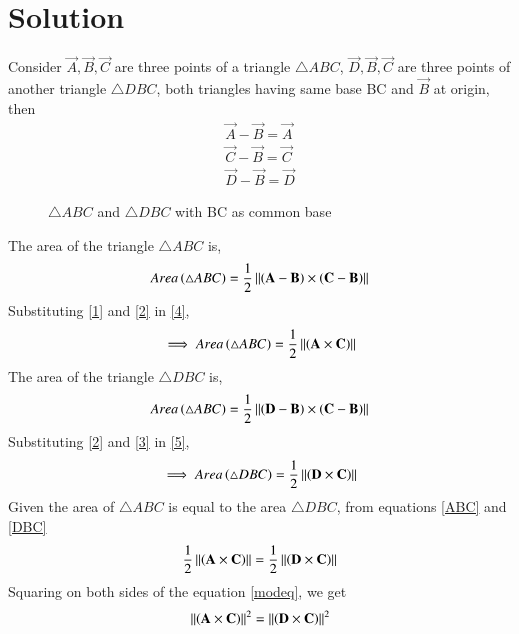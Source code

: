 \documentclass[journal,12pt,twocolumn]{IEEEtran}
\begin{document}
\section{Solution}
\item Consider $\vec{A},\vec{B},\vec{C}$ are three points of a triangle $\triangle ABC$, $\vec{D}, \vec{B}, \vec{C}$ are three points of another triangle $\triangle DBC$, both triangles having same base BC and $\vec{B}$ at origin, then
\begin{align}
    \label{1}
    \vec{A}-\vec{B}=\vec{A}\\
    \label{2}
    \vec{C}-\vec{B}=\vec{C}\\
    \label{3}
    \vec{D}-\vec{B}=\vec{D}
\end{align}
\renewcommand{\thefigure}{1}
\begin{figure}[!ht]
\centering
\resizebox{\columnwidth}{!}{}
\caption{$\triangle ABC$ and $\triangle DBC$ with BC as common base}
\label{fig:1.2}
\end{figure}
The area of the triangle $\triangle ABC$ is,
\begin{align}
    \label{4}
    Area\left(\triangle ABC\right) = \frac{1}{2}\left\lVert\left(\mathbf{A} - \mathbf{B}\right) \times \left(\mathbf{C} - \mathbf{B}\right)\right\rVert
\end{align}
Substituting \eqref{1} and \eqref{2} in \eqref{4}, 
\begin{align}
    \label{ABC}
    \implies Area\left(\triangle ABC\right) = \frac{1}{2}\left\lVert\left(\mathbf{A} \times \mathbf{C}\right)\right\rVert
\end{align}
The area of the triangle $\triangle DBC$ is,
\begin{align}
    \label{5}
    Area\left(\triangle ABC\right) = \frac{1}{2}\left\lVert\left(\mathbf{D} - \mathbf{B}\right) \times \left(\mathbf{C} - \mathbf{B}\right)\right\rVert
\end{align}   
Substituting \eqref{2} and \eqref{3} in \eqref{5}, 
\begin{align}
    \label{DBC}
    \implies Area\left(\triangle DBC\right) = \frac{1}{2}\left\lVert\left(\mathbf{D} \times \mathbf{C}\right)\right\rVert
\end{align}
Given the area of $\triangle ABC$ is equal to the area $\triangle DBC$, from equations \eqref{ABC} and \eqref{DBC}
\begin{align}
    \label{modeq}
    \frac{1}{2}\left\lVert\left(\mathbf{A} \times \mathbf{C}\right)\right\rVert = \frac{1}{2}\left\lVert\left(\mathbf{D} \times \mathbf{C}\right)\right\rVert
\end{align}
Squaring on both sides of the equation \eqref{modeq}, we get
\begin{align}
    \left\lVert\left(\mathbf{A} \times \mathbf{C}\right)\right\rVert^2 = \left\lVert\left(\mathbf{D} \times \mathbf{C}\right)\right\rVert^2
\end{align}
\end{document}
